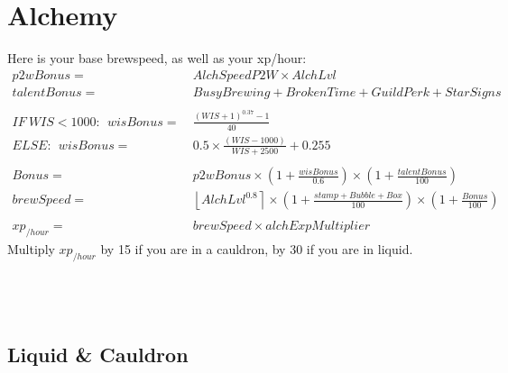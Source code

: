 \chapter{Alchemy}
    Here is your base brewspeed, as well as your xp/hour: 
    \begin{align*}
        p2wBonus = &\ AlchSpeedP2W \times AlchLvl 
        \\
        talentBonus = &\ BusyBrewing + BrokenTime + GuildPerk + StarSigns
        \\ 
        \\
        IF \ WIS < 1000: \ \ wisBonus = &\ \frac{(WIS+1)^{0.37}-1}{40} 
        \\ 
        ELSE: \ \ wisBonus = &\ 0.5 \times \frac{(WIS-1000)}{WIS+2500}+0.255
        \\ 
        \\ 
        Bonus = &\ p2wBonus \times \left( 1 + \frac{wisBonus}{0.6}\right) \times \left( 1+ \frac{talentBonus}{100}\right)
        \\ 
        brewSpeed = &\ \left\lfloor AlchLvl^{0.8} \right\rceil  \times \left( 1+ \frac{stamp+Bubble+Box}{100}\right)\times \left( 1+\frac{Bonus}{100}\right)
        \\ 
        \\ 
        xp_{/hour}= &\ brewSpeed \times alchExpMultiplier 
    \end{align*}
    Multiply $xp_{/hour}$ by 15 if you are in a cauldron, by 30 if you are in liquid.
    \\ 
    \\ 
    \\ 
    \\ 
    \newpage
    \section{Liquid \& Cauldron}
